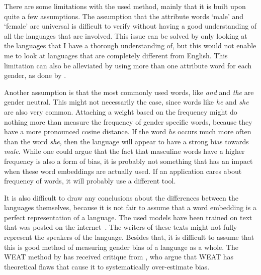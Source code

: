 There are some limitations with the used method, mainly that it is built upon quite a few
assumptions.
The assumption that the attribute words `male' and `female' are universal is difficult
to verify without having a good understanding of all the languages that are involved.
This issue can be solved by only looking at the languages that I have a thorough
understanding of, but this would not enable me to look at languages that are completely
different from English. This limitation can also be alleviated by using more than one
attribute word for each gender, as done by \textcite{caliskan_2017_semantics_language_corpora}.

Another assumption is that the most commonly used words, like \textit{and} and \textit{the}
are gender neutral. This might not necessarily the case, since words like \textit{he} and
\textit{she} are also very common. Attaching a weight based on the frequency might do
nothing more than measure the frequency of gender specific words, because they have a
more pronounced cosine distance. If the word \textit{he} occurs much more often than
the word \textit{she}, then the language will appear to have a strong bias towards
\textit{male}. While one could argue that the fact that masculine words have a higher
frequency is also a form of bias, it is probably not something that has an impact when
these word embeddings are actually used. If an application cares about frequency of words,
it will probably use a different tool.

It is also difficult to draw any conclusions about the differences between the languages
themselves, because it is not fair to assume that a word embedding is a perfect
representation of a language. The used models have been trained on text that was 
posted on the internet~\parencite{grave2018learning}. The writers of these texts might
not fully represent the speakers of the language.
Besides that, it is difficult to assume that this is
good method of measuring gender bias of a language as a whole. The WEAT method by
\textcite{caliskan_2017_semantics_language_corpora} has received critique from
\textcite{ethayarajh-etal-2019-understanding}, who argue that WEAT has theoretical flaws 
that cause it to systematically over-estimate bias.
